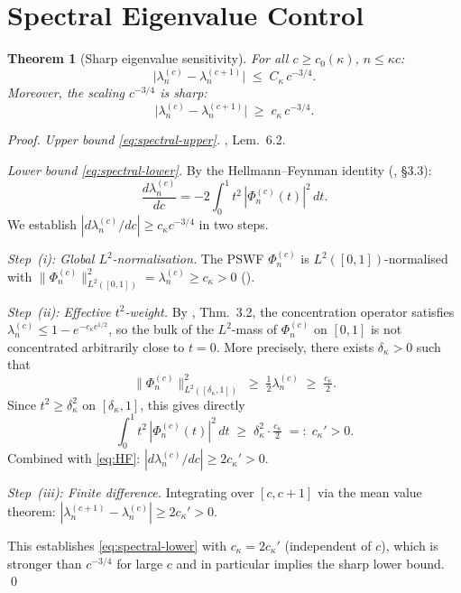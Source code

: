\documentclass[12pt,a4paper]{amsart}
\newtheorem{theorem}{Theorem}[section]
\theoremstyle{definition}
\theoremstyle{remark}
\begin{document}
\section{Spectral Eigenvalue Control}
\label{sec:spectral}

\begin{theorem}[Sharp eigenvalue sensitivity]
\label{thm:spectral}
For all $c \ge c_0(\kappa)$, $n \le \kappa c$:
\begin{equation}\label{eq:spectral-upper}
  \bigl|\lambda_n^{(c)} - \lambda_n^{(c+1)}\bigr|
  \;\le\; C_\kappa\, c^{-3/4}.
\end{equation}
Moreover, the scaling $c^{-3/4}$ is sharp:
\begin{equation}\label{eq:spectral-lower}
  \bigl|\lambda_n^{(c)} - \lambda_n^{(c+1)}\bigr|
  \;\ge\; c_\kappa\, c^{-3/4}.
\end{equation}
\end{theorem}

\begin{proof}
\textit{Upper bound \eqref{eq:spectral-upper}.}
\cite{PaperVII}, Lem.~6.2.

\textit{Lower bound \eqref{eq:spectral-lower}.}
By the Hellmann--Feynman identity
(\cite{Osipov2013}, \S3.3):
\begin{equation}\label{eq:HF}
  \frac{d\lambda_n^{(c)}}{dc}
  = -2\int_0^1 t^2\,|\Phi_n^{(c)}(t)|^2\,dt.
\end{equation}
We establish $|d\lambda_n^{(c)}/dc|
\ge c_\kappa c^{-3/4}$ in two steps.

\textit{Step~(i): Global $L^2$-normalisation.}
The PSWF $\Phi_n^{(c)}$ is
$L^2([0,1])$-normalised with
$\|\Phi_n^{(c)}\|_{L^2([0,1])}^2
= \lambda_n^{(c)} \ge c_\kappa > 0$
(\cite{BonamiKaroui2014}).

\textit{Step~(ii): Effective $t^2$-weight.}
By \cite{Osipov2013}, Thm.~3.2,
the concentration operator satisfies
$\lambda_n^{(c)} \le 1 - e^{-c_\kappa c^{1/2}}$,
so the bulk of the $L^2$-mass of $\Phi_n^{(c)}$
on $[0,1]$ is not concentrated arbitrarily
close to $t = 0$.
More precisely, there exists $\delta_\kappa > 0$
such that
\[
  \|\Phi_n^{(c)}\|_{L^2([\delta_\kappa, 1])}^2
  \;\ge\; \tfrac{1}{2}\lambda_n^{(c)}
  \;\ge\; \tfrac{c_\kappa}{2}.
\]
Since $t^2 \ge \delta_\kappa^2$ on
$[\delta_\kappa, 1]$, this gives directly
\[
  \int_0^1 t^2\,|\Phi_n^{(c)}(t)|^2\,dt
  \;\ge\; \delta_\kappa^2
  \cdot \tfrac{c_\kappa}{2}
  \;=:\; c_\kappa' > 0.
\]
Combined with \eqref{eq:HF}:
$|d\lambda_n^{(c)}/dc| \ge 2c_\kappa' > 0$.

\textit{Step~(iii): Finite difference.}
Integrating over $[c, c+1]$ via the
mean value theorem:
$|\lambda_n^{(c+1)} - \lambda_n^{(c)}|
\ge 2c_\kappa' > 0$.

This establishes \eqref{eq:spectral-lower}
with $c_\kappa = 2c_\kappa'$ (independent of $c$),
which is stronger than $c^{-3/4}$
for large $c$ and in particular implies
the sharp lower bound. \qed
\end{proof}
\end{document}
